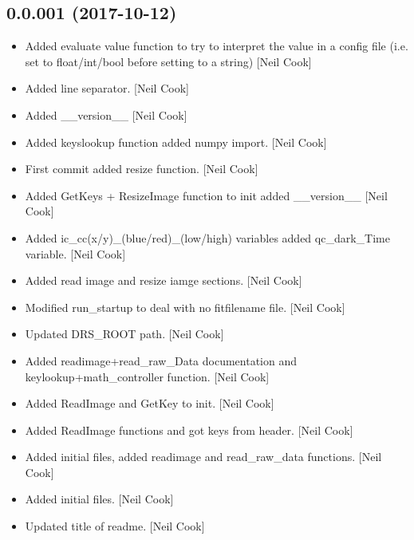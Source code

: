 \documentclass[a4paper,10pt,english]{report}
\begin{document}
\subsection{0.0.001 (2017-10-12)}
\label{\detokenize{misc/changelog:id548}}\begin{itemize}
\item {} 
Added evaluate value function to try to interpret the value in a
config file (i.e. set to float/int/bool before setting to a string)
{[}Neil Cook{]}

\item {} 
Added line separator. {[}Neil Cook{]}

\item {} 
Added \_\_version\_\_ {[}Neil Cook{]}

\item {} 
Added keyslookup function added numpy import. {[}Neil Cook{]}

\item {} 
First commit added resize function. {[}Neil Cook{]}

\item {} 
Added GetKeys + ResizeImage function to init added \_\_version\_\_ {[}Neil
Cook{]}

\item {} 
Added ic\_cc(x/y)\_(blue/red)\_(low/high) variables added qc\_dark\_Time
variable. {[}Neil Cook{]}

\item {} 
Added read image and resize iamge sections. {[}Neil Cook{]}

\item {} 
Modified run\_startup to deal with no fitfilename file. {[}Neil Cook{]}

\item {} 
Updated DRS\_ROOT path. {[}Neil Cook{]}

\item {} 
Added readimage+read\_raw\_Data documentation and
keylookup+math\_controller function. {[}Neil Cook{]}

\item {} 
Added ReadImage and GetKey to init. {[}Neil Cook{]}

\item {} 
Added ReadImage functions and got keys from header. {[}Neil Cook{]}

\item {} 
Added initial files, added readimage and read\_raw\_data functions.
{[}Neil Cook{]}

\item {} 
Added initial files. {[}Neil Cook{]}

\item {} 
Updated title of readme. {[}Neil Cook{]}

\end{itemize}



\renewcommand{\indexname}{Index}
\printindex
\end{document}
